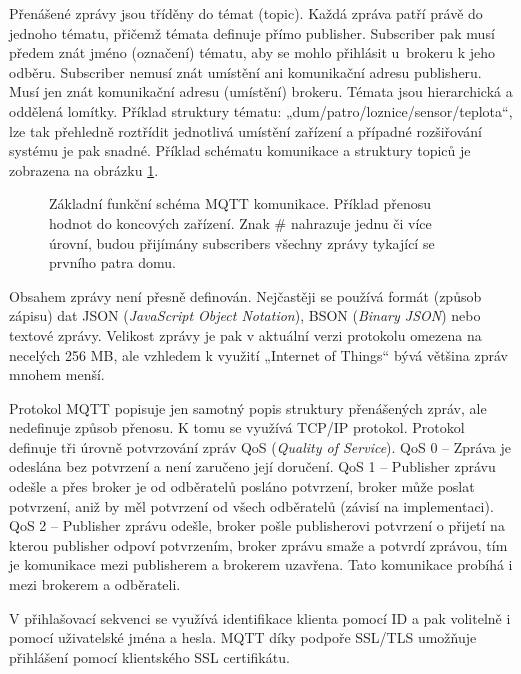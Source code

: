 Přenášené zprávy jsou tříděny do témat (topic). Každá zpráva patří právě do jednoho tématu, přičemž témata definuje přímo publisher. Subscriber pak musí předem znát jméno (označení) tématu, aby se mohlo přihlásit u~brokeru k jeho odběru. Subscriber nemusí znát umístění ani komunikační adresu publisheru. Musí jen znát komunikační adresu (umístění) brokeru. Témata jsou hierarchická a oddělená lomítky. Příklad struktury tématu: „dum/patro/loznice/sensor/teplota“, lze tak přehledně roztřídit jednotlivá umístění zařízení a případné rozšiřování systému je pak snadné. Příklad schématu komunikace a struktury topiců je zobrazena na obrázku \ref{fig:mqtt-protokol}.

\begin{figure}[H]
    \centering
    \def\svgwidth{\columnwidth}
    
    \caption{Základní funkční schéma MQTT komunikace. Příklad přenosu hodnot do koncových zařízení. Znak \# nahrazuje jednu či více úrovní, budou přijímány subscribers  všechny zprávy tykající se prvního patra domu.}
    \label{fig:mqtt-protokol}
\end{figure}

Obsahem zprávy není přesně definován. Nejčastěji se používá formát (způsob zápisu) dat JSON (\textit{JavaScript Object Notation}), BSON (\textit{Binary JSON}) nebo textové zprávy. Velikost zprávy je pak v aktuální verzi protokolu omezena na necelých 256 MB, ale vzhledem k využití „Internet of Things“ bývá většina zpráv mnohem menší.

Protokol MQTT popisuje jen samotný popis struktury přenášených zpráv, ale nedefinuje způsob přenosu. K tomu se využívá TCP/IP protokol. Protokol definuje tři úrovně potvrzování zpráv QoS (\textit{Quality of Service}). QoS 0 – Zpráva je odeslána bez potvrzení a není zaručeno její doručení. QoS 1 – Publisher zprávu odešle a přes broker je od odběratelů posláno potvrzení, broker může poslat potvrzení, aniž by měl potvrzení od všech odběratelů (závisí na implementaci). QoS 2 – Publisher zprávu odešle, broker pošle publisherovi potvrzení o přijetí na kterou publisher odpoví potvrzením, broker zprávu smaže a potvrdí zprávou, tím je komunikace mezi publisherem a brokerem uzavřena. Tato komunikace probíhá i mezi brokerem a odběrateli.


V přihlašovací sekvenci se využívá identifikace klienta pomocí ID a pak volitelně i pomocí uživatelské jména a hesla. MQTT díky podpoře SSL/TLS umožňuje přihlášení pomocí klientského SSL certifikátu.
